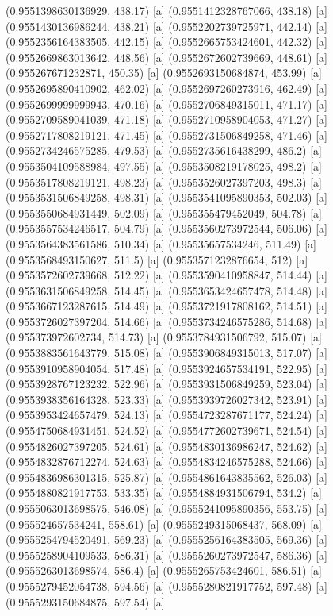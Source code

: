{{{(0.9551398630136929, 438.17) [a] 
(0.9551412328767066, 438.18) [a] 
(0.9551430136986244, 438.21) [a] 
(0.9552202739725971, 442.14) [a] 
(0.9552356164383505, 442.15) [a] 
(0.9552665753424601, 442.32) [a] 
(0.9552669863013642, 448.56) [a] 
(0.9552672602739669, 448.61) [a] 
(0.955267671232871, 450.35) [a] 
(0.9552693150684874, 453.99) [a] 
(0.9552695890410902, 462.02) [a] 
(0.9552697260273916, 462.49) [a] 
(0.9552699999999943, 470.16) [a] 
(0.9552706849315011, 471.17) [a] 
(0.9552709589041039, 471.18) [a] 
(0.9552710958904053, 471.27) [a] 
(0.9552717808219121, 471.45) [a] 
(0.9552731506849258, 471.46) [a] 
(0.9552734246575285, 479.53) [a] 
(0.9552735616438299, 486.2) [a] 
(0.9553504109588984, 497.55) [a] 
(0.9553508219178025, 498.2) [a] 
(0.9553517808219121, 498.23) [a] 
(0.9553526027397203, 498.3) [a] 
(0.9553531506849258, 498.31) [a] 
(0.9553541095890353, 502.03) [a] 
(0.9553550684931449, 502.09) [a] 
(0.955355479452049, 504.78) [a] 
(0.9553557534246517, 504.79) [a] 
(0.9553560273972544, 506.06) [a] 
(0.9553564383561586, 510.34) [a] 
(0.95535657534246, 511.49) [a] 
(0.9553568493150627, 511.5) [a] 
(0.9553571232876654, 512) [a] 
(0.9553572602739668, 512.22) [a] 
(0.9553590410958847, 514.44) [a] 
(0.9553631506849258, 514.45) [a] 
(0.9553653424657478, 514.48) [a] 
(0.9553667123287615, 514.49) [a] 
(0.9553721917808162, 514.51) [a] 
(0.9553726027397204, 514.66) [a] 
(0.9553734246575286, 514.68) [a] 
(0.955373972602734, 514.73) [a] 
(0.9553784931506792, 515.07) [a] 
(0.9553883561643779, 515.08) [a] 
(0.9553906849315013, 517.07) [a] 
(0.9553910958904054, 517.48) [a] 
(0.9553924657534191, 522.95) [a] 
(0.9553928767123232, 522.96) [a] 
(0.9553931506849259, 523.04) [a] 
(0.9553938356164328, 523.33) [a] 
(0.9553939726027342, 523.91) [a] 
(0.9553953424657479, 524.13) [a] 
(0.9554723287671177, 524.24) [a] 
(0.9554750684931451, 524.52) [a] 
(0.9554772602739671, 524.54) [a] 
(0.9554826027397205, 524.61) [a] 
(0.9554830136986247, 524.62) [a] 
(0.9554832876712274, 524.63) [a] 
(0.9554834246575288, 524.66) [a] 
(0.9554836986301315, 525.87) [a] 
(0.9554861643835562, 526.03) [a] 
(0.9554880821917753, 533.35) [a] 
(0.9554884931506794, 534.2) [a] 
(0.9555063013698575, 546.08) [a] 
(0.9555241095890356, 553.75) [a] 
(0.955524657534241, 558.61) [a] 
(0.9555249315068437, 568.09) [a] 
(0.9555254794520491, 569.23) [a] 
(0.9555256164383505, 569.36) [a] 
(0.9555258904109533, 586.31) [a] 
(0.9555260273972547, 586.36) [a] 
(0.9555263013698574, 586.4) [a] 
(0.9555265753424601, 586.51) [a] 
(0.9555279452054738, 594.56) [a] 
(0.9555280821917752, 597.48) [a] 
(0.9555293150684875, 597.54) [a] 
}}}
